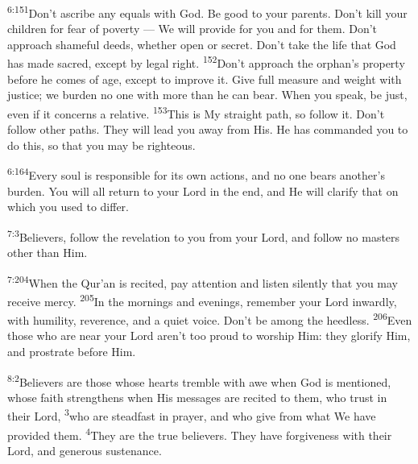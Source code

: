 \documentclass[openany,12pt,english]{book}
\newenvironment{para}{\par\pretolerance=100\tolerance=200\setlength{\emergencystretch}{0.6em}\relax}{\par}
\begin{document}
\begin{para}
    \textsuperscript{6:151}\thinspace{}Don't as\-cribe any equals with God. Be good to your parents. Don't kill your chil\-dren for fear of pov\-er\-ty --- We will pro\-vide for you and for them. Don't ap\-proach shame\-ful deeds, wheth\-er o\-pen or se\-cret. Don't take the life that God has made sa\-cred, ex\-cept by le\-gal right.
    \textsuperscript{152}\thinspace{}Don't ap\-proach the orphan's prop\-er\-ty be\-fore he co\-mes of age, ex\-cept to im\-prove it. Give full meas\-ure and weight with jus\-tice; we bur\-den no one with more than he can bear. When you speak, be just, e\-ven if it concerns a rel\-a\-tive.
    \textsuperscript{153}\thinspace{}This is My straight path, so fol\-low it. Don't fol\-low oth\-er paths. They will lead you a\-way from His. He has commanded you to do this, so that you may be right\-eous.
\end{para}

\begin{para}
    \textsuperscript{6:164}\thinspace{}Eve\-ry soul is re\-spon\-si\-ble for its own actions, and no one bears another's bur\-den. You will all re\-turn to your Lord in the end, and He will clar\-i\-fy that on which you used to dif\-fer.
\end{para}

\bigskip{}

\begin{para}
    \textsuperscript{7:3}\thinspace{}Believers, fol\-low the rev\-e\-la\-tion to you from your Lord, and fol\-low no masters oth\-er than Him.
\end{para}

\begin{para}
    \textsuperscript{7:204}\thinspace{}When the Qur'an is re\-cit\-ed, pay at\-ten\-tion and lis\-ten si\-lent\-ly that you may re\-ceive mer\-cy.
    \textsuperscript{205}\thinspace{}In the morn\-ings and eve\-nings, re\-mem\-ber your Lord in\-ward\-ly, with hu\-mil\-i\-ty, rev\-er\-ence, and a qui\-et voice. Don't be a\-mong the heed\-less.
    \textsuperscript{206}\thinspace{}E\-ven those who are near your Lord aren't too proud to wor\-ship Him: they glo\-ri\-fy Him, and pros\-trate be\-fore Him.
\end{para}

\bigskip{}

\begin{para}
    \textsuperscript{8:2}\thinspace{}Believers are those whose hearts trem\-ble with awe when God is mentioned, whose faith strengthens when His messages are re\-cit\-ed to them, who trust in their Lord,
    \textsuperscript{3}\thinspace{}who are stead\-fast in pray\-er, and who give from what We have pro\-vid\-ed them.
    \textsuperscript{4}\thinspace{}They are the true believers. They have for\-give\-ness with their Lord, and gen\-er\-ous sus\-te\-nance.
\end{para}
\end{document}
